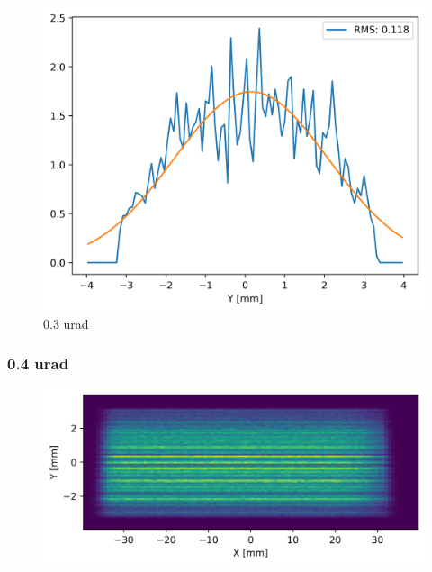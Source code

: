 \begin{figure}[H]
\centering
\includegraphics[width=0.9\linewidth]{./../figures/slope_error/WB4C_d30_d-spacing_gradient_45keV_slope_error03urad_Yprofile.png}
\caption{0.3 urad}
\label{fig:03urad}
\end{figure}

\clearpage
\subsubsection{0.4 urad}
\begin{figure}[H]
\centering
\includegraphics[width=0.9\linewidth]{./../figures/slope_error/WB4C_d30_d-spacing_gradient_45keV_slope_error04urad.png}
\end{figure}


